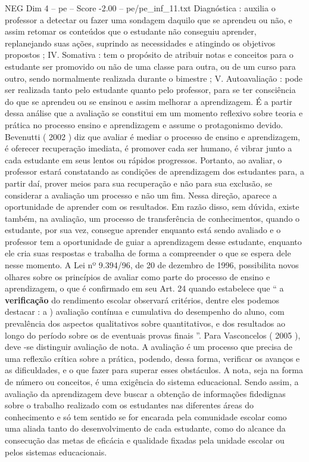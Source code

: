 \begin{textsample}{NEG Dim 4 – pe – Score -2.00 – pe/pe\_inf\_11.txt}
Diagnóstica : auxilia o professor a detectar ou fazer uma sondagem daquilo que se aprendeu ou não, e assim retomar os conteúdos que o estudante não conseguiu aprender, replanejando suas ações, suprindo as necessidades e atingindo os objetivos propostos ; IV.
Somativa : tem o propósito de atribuir notas e conceitos para o estudante ser promovido ou não de uma classe para outra, ou de um curso para outro, sendo normalmente realizada durante o bimestre ; V.
Autoavaliação : pode ser realizada tanto pelo estudante quanto pelo professor, para se ter consciência do que se aprendeu ou se ensinou e assim melhorar a aprendizagem.
É a partir dessa análise que a avaliação se constitui em um momento reflexivo sobre teoria e prática no processo ensino e aprendizagem e assume o protagonismo devido.
Bevenutti ( 2002 ) diz que avaliar é mediar o processo de ensino e aprendizagem, é oferecer recuperação imediata, é promover cada ser humano, é vibrar junto a cada estudante em seus lentos ou rápidos progressos.
Portanto, ao avaliar, o professor estará constatando as condições de aprendizagem dos estudantes para, a partir daí, prover meios para sua recuperação e não para sua exclusão, se considerar a avaliação um processo e não um fim.
Nessa direção, aparece a oportunidade de aprender com os resultados.
Em razão disso, sem dúvida, existe também, na avaliação, um processo de transferência de conhecimentos, quando o estudante, por sua vez, consegue aprender enquanto está sendo avaliado e o professor tem a oportunidade de guiar a aprendizagem desse estudante, enquanto ele cria suas respostas e trabalha de forma a compreender o que se espera dele nesse momento.
A Lei nº 9.394/96, de 20 de dezembro de 1996, possibilita novos olhares sobre os princípios de avaliar como parte do processo de ensino e aprendizagem, o que é confirmado em seu Art. 24 quando estabelece que “ a \textbf{verificação} do rendimento escolar observará critérios, dentre eles podemos destacar : a ) avaliação contínua e cumulativa do desempenho do aluno, com prevalência dos aspectos qualitativos sobre quantitativos, e dos resultados ao longo do período sobre os de eventuais provas finais ”.
Para Vasconcelos ( 2005 ), deve -se distinguir avaliação de nota.
A avaliação é um processo que precisa de uma reflexão crítica sobre a prática, podendo, dessa forma, verificar os avanços e as dificuldades, e o que fazer para superar esses obstáculos.
A nota, seja na forma de número ou conceitos, é uma exigência do sistema educacional.
Sendo assim, a avaliação da aprendizagem deve buscar a obtenção de informações fidedignas sobre o trabalho realizado com os estudantes nas diferentes áreas do conhecimento e só tem sentido se for encarada pela comunidade escolar como uma aliada tanto do desenvolvimento de cada estudante, como do alcance da consecução das metas de eficácia e qualidade fixadas pela unidade escolar ou pelos sistemas educacionais.

\end{textsample}
